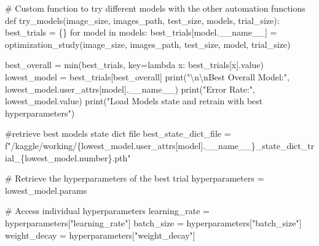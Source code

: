 \documentclass[
  letterpaper,
  DIV=11,
  numbers=noendperiod]{scrartcl}
\newenvironment{Shaded}{\begin{snugshade}}{\end{snugshade}}
\newcommand{\BuiltInTok}[1]{\textcolor[rgb]{0.00,0.23,0.31}{#1}}
\newcommand{\CharTok}[1]{\textcolor[rgb]{0.13,0.47,0.30}{#1}}
\newcommand{\CommentTok}[1]{\textcolor[rgb]{0.37,0.37,0.37}{#1}}
\newcommand{\ControlFlowTok}[1]{\textcolor[rgb]{0.00,0.23,0.31}{#1}}
\newcommand{\KeywordTok}[1]{\textcolor[rgb]{0.00,0.23,0.31}{#1}}
\newcommand{\NormalTok}[1]{\textcolor[rgb]{0.00,0.23,0.31}{#1}}
\newcommand{\OperatorTok}[1]{\textcolor[rgb]{0.37,0.37,0.37}{#1}}
\newcommand{\SpecialCharTok}[1]{\textcolor[rgb]{0.37,0.37,0.37}{#1}}
\newcommand{\SpecialStringTok}[1]{\textcolor[rgb]{0.13,0.47,0.30}{#1}}
\newcommand{\StringTok}[1]{\textcolor[rgb]{0.13,0.47,0.30}{#1}}
\newcommand{\VariableTok}[1]{\textcolor[rgb]{0.07,0.07,0.07}{#1}}
\begin{document}
\hypertarget{custom-trymodels}{}
\begin{Shaded}
\begin{Highlighting}[]
\CommentTok{\# Custom function to try different models with the other automation functions}
\KeywordTok{def}\NormalTok{ try\_models(image\_size, images\_path, test\_size, models, trial\_size):}
\NormalTok{    best\_trials }\OperatorTok{=}\NormalTok{ \{\}}
    \ControlFlowTok{for}\NormalTok{ model }\KeywordTok{in}\NormalTok{ models:}
\NormalTok{        best\_trials[model.}\VariableTok{\_\_name\_\_}\NormalTok{] }\OperatorTok{=}\NormalTok{ optimization\_study(image\_size, images\_path, test\_size, model, trial\_size)}
        
\NormalTok{    best\_overall }\OperatorTok{=} \BuiltInTok{min}\NormalTok{(best\_trials,  key}\OperatorTok{=}\KeywordTok{lambda}\NormalTok{ x: best\_trials[x].value)}
\NormalTok{    lowest\_model }\OperatorTok{=}\NormalTok{ best\_trials[best\_overall]}
    \BuiltInTok{print}\NormalTok{(}\StringTok{"}\CharTok{\textbackslash{}n\textbackslash{}n}\StringTok{Best Overall Model:"}\NormalTok{, lowest\_model.user\_attrs[}\StringTok{\textquotesingle{}model\textquotesingle{}}\NormalTok{].}\VariableTok{\_\_name\_\_}\NormalTok{)}
    \BuiltInTok{print}\NormalTok{(}\StringTok{"Error Rate:"}\NormalTok{, lowest\_model.value)}
    \BuiltInTok{print}\NormalTok{(}\StringTok{"Load Model\textquotesingle{}s state and retrain with best hyperparameters"}\NormalTok{)}
    
    
    \CommentTok{\#retrieve best model\textquotesingle{}s state dict file}
\NormalTok{    best\_state\_dict\_file }\OperatorTok{=} \SpecialStringTok{f"/kaggle/working/}\SpecialCharTok{\{}\NormalTok{lowest\_model}\SpecialCharTok{.}\NormalTok{user\_attrs[}\StringTok{\textquotesingle{}model\textquotesingle{}}\NormalTok{]}\SpecialCharTok{.}\VariableTok{\_\_name\_\_}\SpecialCharTok{\}}\SpecialStringTok{\_state\_dict\_trial\_}\SpecialCharTok{\{}\NormalTok{lowest\_model}\SpecialCharTok{.}\NormalTok{number}\SpecialCharTok{\}}\SpecialStringTok{.pth"}

    
    \CommentTok{\# Retrieve the hyperparameters of the best trial}
\NormalTok{    hyperparameters }\OperatorTok{=}\NormalTok{ lowest\_model.params}

    \CommentTok{\# Access individual hyperparameters}
\NormalTok{    learning\_rate }\OperatorTok{=}\NormalTok{ hyperparameters[}\StringTok{"learning\_rate"}\NormalTok{]}
\NormalTok{    batch\_size }\OperatorTok{=}\NormalTok{ hyperparameters[}\StringTok{"batch\_size"}\NormalTok{]}
\NormalTok{    weight\_decay }\OperatorTok{=}\NormalTok{ hyperparameters[}\StringTok{"weight\_decay"}\NormalTok{]}


\end{Highlighting}
\end{Shaded}
\end{document}

